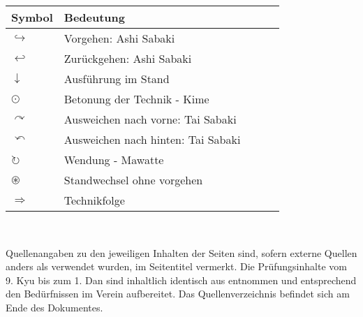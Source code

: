 	\begin{tabularx}{\textwidth}{lllll}
		Symbol	& Bedeutung	& &&\\
		\midrule
		\(\hookrightarrow\) 	& Vorgehen: Ashi Sabaki					& & &\\
		\(\hookleftarrow\) 		& Zurückgehen: Ashi Sabaki				& & &\\
		\(\downarrow\) 			& Ausführung im Stand					& & &\\
		\(\odot\) 				& Betonung der Technik - Kime			& & &\\
		\(\curvearrowright\)	& Ausweichen nach vorne: Tai Sabaki		& & &\\
		\(\curvearrowleft\)		& Ausweichen nach hinten: Tai Sabaki	& & &\\
		\(\circlearrowright\)	& Wendung - Mawatte						& & &\\
		\(\circledast\)			& Standwechsel ohne vorgehen			& & &\\
		\(\Rightarrow\)			& Technikfolge							& & &\\
	\end{tabularx}\\\null\vfill\null
	\begin{center}
	\parbox{\textwidth-2\tabcolsep}{%
	Quellenangaben zu den jeweiligen Inhalten der Seiten sind, sofern externe Quellen anders als \cite{Internet} verwendet wurden, im Seitentitel vermerkt. Die Prüfungsinhalte vom 9. Kyu bis zum 1. Dan sind inhaltlich identisch aus \cite{GKD2023} entnommen und entsprechend den Bedürfnissen im Verein aufbereitet. Das Quellenverzeichnis befindet sich am Ende des Dokumentes.}
	\end{center}\null\vfill\null